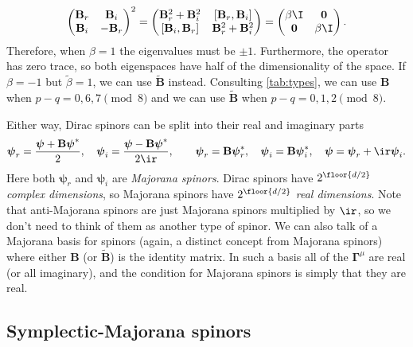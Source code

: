 \documentclass[11pt]{article}
\newcommand{\Gammab}{\boldsymbol{\Gamma}}
\newcommand{\B}{\mathbf{B}}
\newcommand{\Bt}{\widetilde{\mathbf{B}}}
\newcommand{\psib}{\boldsymbol{\psi}}
\newcommand{\betat}{\tilde{\beta}}
\begin{document}
\begin{equation*}
    \begin{pmatrix}
      \B_r &  \B_i \\
      \B_i & -\B_r \\
    \end{pmatrix}^2
  =
    \begin{pmatrix}
      \B_r^2 + \B_i^2 & [\B_r, \B_i]    \\
      [\B_i, \B_r]    & \B_r^2 + \B_i^2 \\
    \end{pmatrix}
  =
    \begin{pmatrix}
      \beta \I   & \mathbf{0} \\
      \mathbf{0} & \beta \I   \\
    \end{pmatrix}.
\end{equation*}
%
Therefore, when $\beta=1$ the eigenvalues must be $\pm 1$.
Furthermore, the operator has zero trace, so both eigenspaces have half of the dimensionality of the space.
If $\beta=-1$ but $\betat=1$, we can use $\Bt$ instead.
Consulting \cref{tab:types}, we can use $\B$ when $p-q = 0,6,7 \pmod 8$ and we can use $\Bt$ when $p-q = 0,1,2 \pmod 8$.

Either way, Dirac spinors can be split into their real and imaginary parts
%
\begin{equation}\label{eq:majorana}
  \psib_r = \frac{\psib + \B \psib^\ast}{2},
  \quad
  \psib_i = \frac{\psib - \B \psib^\ast}{2\ir},
  \qquad
  \psib_r = \B \psib^\ast_r,
  \quad
  \psib_i = \B \psib^\ast_i,
  \quad
  \psib = \psib_r + \ir \psib_i.
\end{equation}
%
Here both $\psib_r$ and $\psib_i$ are \emph{Majorana spinors}.
Dirac spinors have $2^{\floor{d/2}}$ \emph{complex dimensions}, so Majorana spinors have $2^{\floor{d/2}}$ \emph{real dimensions}.
Note that anti-Majorana spinors are just Majorana spinors multiplied by $\ir$, so we don't need to think of them as another type of spinor.
We can also talk of a Majorana basis for spinors (again, a distinct concept from Majorana spinors) where either $\B$ (or $\Bt$) is the identity matrix.
In such a basis all of the $\Gammab^\mu$ are real (or all imaginary), and the condition for Majorana spinors is simply that they are real.


\subsection{Symplectic-Majorana spinors}\label{sec:symplecticmajorana}
\end{document}

